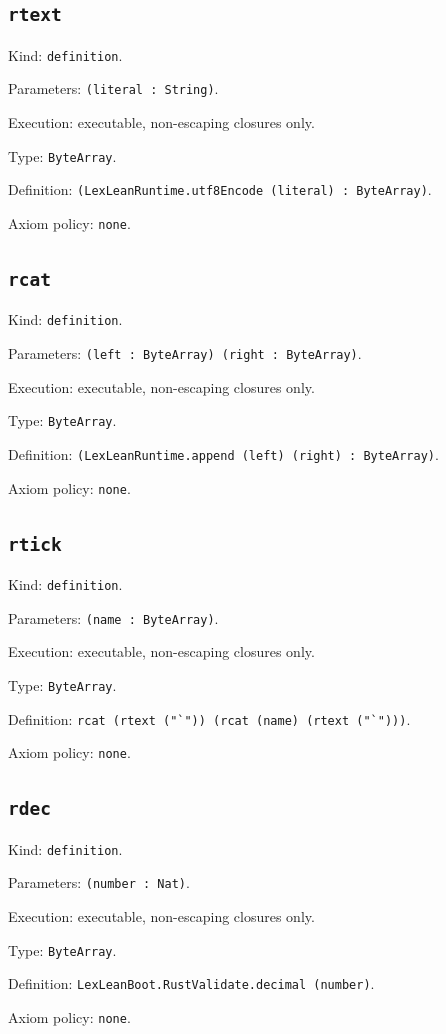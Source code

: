 \documentclass[11pt]{article}
\begin{document}
\subsection*{\texttt{rtext}}
\noindent Kind: \texttt{definition}.\par
\noindent Parameters: \texttt{(literal : String)}.\par
\noindent Execution: executable, non-escaping closures only.\par
\noindent Type: \texttt{ByteArray}.\par
\noindent Definition: \texttt{(LexLeanRuntime.utf8Encode (literal) : ByteArray)}.\par
\noindent Axiom policy: \texttt{none}.\par
\subsection*{\texttt{rcat}}
\noindent Kind: \texttt{definition}.\par
\noindent Parameters: \texttt{(left : ByteArray) (right : ByteArray)}.\par
\noindent Execution: executable, non-escaping closures only.\par
\noindent Type: \texttt{ByteArray}.\par
\noindent Definition: \texttt{(LexLeanRuntime.append (left) (right) : ByteArray)}.\par
\noindent Axiom policy: \texttt{none}.\par
\subsection*{\texttt{rtick}}
\noindent Kind: \texttt{definition}.\par
\noindent Parameters: \texttt{(name : ByteArray)}.\par
\noindent Execution: executable, non-escaping closures only.\par
\noindent Type: \texttt{ByteArray}.\par
\noindent Definition: \texttt{rcat (rtext ("`")) (rcat (name) (rtext ("`")))}.\par
\noindent Axiom policy: \texttt{none}.\par
\subsection*{\texttt{rdec}}
\noindent Kind: \texttt{definition}.\par
\noindent Parameters: \texttt{(number : Nat)}.\par
\noindent Execution: executable, non-escaping closures only.\par
\noindent Type: \texttt{ByteArray}.\par
\noindent Definition: \texttt{LexLeanBoot.RustValidate.decimal (number)}.\par
\noindent Axiom policy: \texttt{none}.\par
\end{document}
